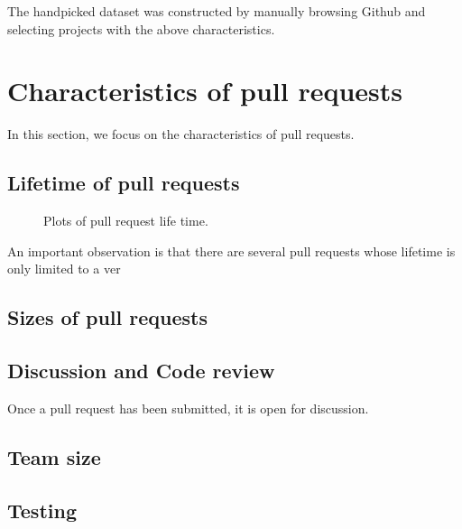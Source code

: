 \documentclass{sig-alternate}
\begin{document}
The \textsf{handpicked} dataset was constructed by manually browsing Github
and selecting projects with the above characteristics.  

\section{Characteristics of pull requests}
In this section, we focus on the characteristics of pull requests. 

\subsection{Lifetime of pull requests}



\begin{figure*}
\centering
{}
\caption{Plots of pull request life time.}
\end{figure*}


An important observation is that there are several pull requests whose
lifetime is only limited to a ver

\subsection{Sizes of pull requests}



\subsection{Discussion and Code review}

Once a pull request has been submitted, it is open for discussion.

\subsection{Team size}

\subsection{Testing}
\end{document}
